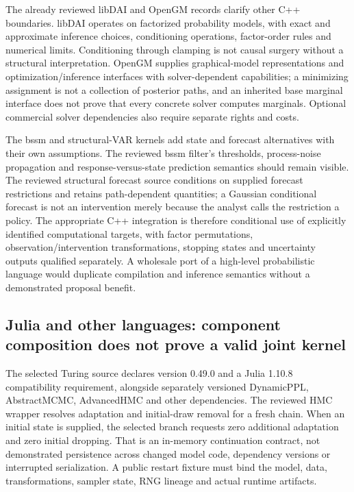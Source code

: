 The already reviewed libDAI and OpenGM records clarify other C++ boundaries. libDAI operates on factorized probability models, with exact and approximate inference choices, conditioning operations, factor-order rules and numerical limits. Conditioning through clamping is not causal surgery without a structural interpretation. OpenGM supplies graphical-model representations and optimization/inference interfaces with solver-dependent capabilities; a minimizing assignment is not a collection of posterior paths, and an inherited base marginal interface does not prove that every concrete solver computes marginals. Optional commercial solver dependencies also require separate rights and costs.~\citep{exec24_libdai_source,exec24_libdai_choice,exec24_opengm_source,exec24_opengm_choice}

The bssm and structural-VAR kernels add state and forecast alternatives with their own assumptions. The reviewed bssm filter's thresholds, process-noise propagation and response-versus-state prediction semantics should remain visible. The reviewed structural forecast source conditions on supplied forecast restrictions and retains path-dependent quantities; a Gaussian conditional forecast is not an intervention merely because the analyst calls the restriction a policy. The appropriate C++ integration is therefore conditional use of explicitly identified computational targets, with factor permutations, observation/intervention transformations, stopping states and uncertainty outputs qualified separately. A wholesale port of a high-level probabilistic language would duplicate compilation and inference semantics without a demonstrated proposal benefit.~\citep{exec25_cdyn_bssm,exec25_cdyn_bsvars,exec25_cdyn_choice,exec25_bsw_choice}

\subsection{Julia and other languages: component composition does not prove a valid joint kernel}

The selected Turing source declares version 0.49.0 and a Julia 1.10.8 compatibility requirement, alongside separately versioned DynamicPPL, AbstractMCMC, AdvancedHMC and other dependencies. The reviewed HMC wrapper resolves adaptation and initial-draw removal for a fresh chain. When an initial state is supplied, the selected branch requests zero additional adaptation and zero initial dropping. That is an in-memory continuation contract, not demonstrated persistence across changed model code, dependency versions or interrupted serialization. A public restart fixture must bind the model, data, transformations, sampler state, RNG lineage and actual runtime artifacts.~\citep{exec25_bsw_turing}

